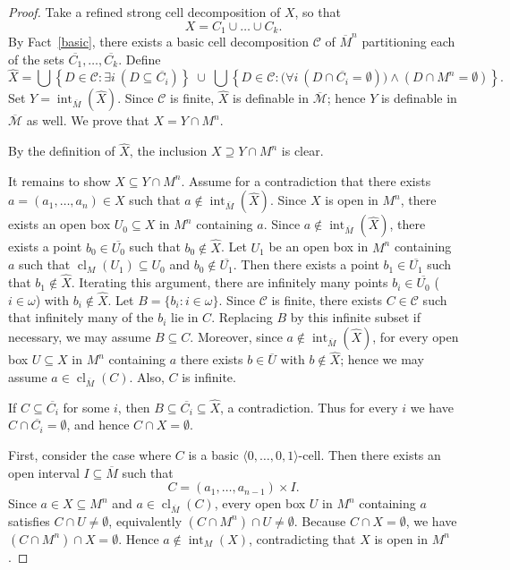 \documentclass[10pt,a4paper]{amsart}
\DeclareMathOperator{\Int}{int}
\DeclareMathOperator{\cl}{cl}
\def \M {{\mathcal M}}
\newcommand{\ov}{\overline}
\begin{document}
\begin{proof}
	Take a refined strong cell decomposition of $X$, so that
	\[
	X = C_1 \cup \dots \cup C_k.
	\]
	By Fact~\ref{basic},
	there exists a basic cell decomposition $\mathcal{C}$ of $\overline{M}^n$ partitioning each of the sets $\ov{C_1},\dots, \ov{C_k}$.
	Define
	\[
	\hat{X}
	= \bigcup \left\{ D\in \mathcal{C} : \exists i\ (D \subseteq \overline{C_i}) \right\}
	\;\cup\;
	\bigcup \left\{ D\in \mathcal{C} : \bigl(\forall i\ (D \cap \overline{C_i} = \emptyset)\bigr) \wedge (D \cap M^n = \emptyset) \right\}.
	\]
	Set $Y = \Int_{\overline{M}}(\hat{X})$.
	Since $\mathcal{C}$ is finite, $\hat{X}$ is definable in $\overline{\M}$; hence $Y$ is definable  in $\overline{\M}$ as well.
	We prove that $X = Y \cap M^n$.
	
	By the definition of $\hat{X}$, the inclusion $X \supseteq Y \cap M^n$ is clear.
	
	It remains to show $X \subseteq Y \cap M^n$.
	Assume for a contradiction that there exists $a=(a_1,\dots,a_n)\in X$ such that
	$a \notin \Int_{\overline{M}}(\hat{X})$.
	Since $X$ is open in $M^n$, there exists an open box $U_0 \subseteq X$ in $M^n$ containing $a$.
	Since $a \notin \operatorname{int}_{\overline{M}}(\hat{X})$, there exists a point $b_0 \in \overline{U_0}$ such that $b_0 \notin \hat{X}$.
	Let $U_1$ be an open box in $M^n$ containing $a$ such that
	$\cl_M(U_1) \subseteq U_0$ and $b_0 \notin \overline{U_1}$.
	Then there exists a point $b_1 \in \overline{U_1}$ such that $b_1 \notin \hat{X}$.
	Iterating this argument, there are infinitely many points
	$b_i \in \overline{U_0}$ ($i\in\omega$) with $b_i \notin \hat{X}$.
	Let $B = \{ b_i : i \in \omega \}$.
	Since $\mathcal{C}$ is finite, there exists $C \in \mathcal{C}$ such that infinitely many of the $b_i$ lie in $C$.
	Replacing $B$ by this infinite subset if necessary, we may assume $B \subseteq C$.
	Moreover, since $a \notin \Int_{\overline{M}}(\hat{X})$, for every open box $U \subseteq X$ in $M^n$ containing $a$ there exists $b \in \overline{U}$ with $b \notin \hat{X}$;
	hence we may assume $a \in \cl_{\overline{M}}(C)$.
	Also, $C$ is infinite.
	
	If $C \subseteq \overline{C_i}$ for some $i$, then $B \subseteq \overline{C_i} \subseteq \hat{X}$, a contradiction.
	Thus for every $i$ we have $C \cap \overline{C_i} = \emptyset$, and hence $C \cap X = \emptyset$.
	
	First, consider the case where $C$ is a basic $\langle 0,\dots,0,1 \rangle$-cell.
	Then there exists an open interval $I \subseteq \overline{M}$ such that
	\[
	C = (a_1,\dots,a_{n-1}) \times I.
	\]
	Since $a \in X \subseteq M^n$ and $a \in \cl_{\overline{M}}(C)$, every open box $U$ in $M^n$ containing $a$ satisfies
	$C \cap U \ne \emptyset$, equivalently $(C \cap M^n) \cap U \ne \emptyset$.
	Because $C \cap X = \emptyset$, we have $(C \cap M^n) \cap X = \emptyset$.
	Hence $a \notin \Int_M(X)$, contradicting that $X$ is open in $M^n$.
	

\end{proof}
\end{document}
